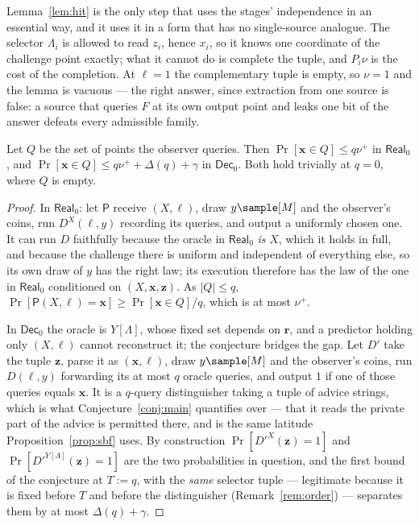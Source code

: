 \documentclass{conjura-conjecture}
\newcommand{\Prob}[1]{\Pr\!\left[#1\right]}
\newcommand{\vz}{\mathbf{z}}
\newcommand{\vr}{\mathbf{r}}
\newcommand{\vx}{\mathbf{x}}
\newcommand{\vl}{\boldsymbol{\ell}}
\newcommand{\Real}{\mathsf{Real}}
\newcommand{\Dec}{\mathsf{Dec}}
\begin{document}
\begin{remark}\label{rem:onesource}
Lemma~\ref{lem:hit} is the only step that uses the stages' independence in
an essential way, and it uses it in a form that has no single-source
analogue. The selector $\Lambda_i$ is allowed to read $z_i$, hence $x_i$,
so it knows one coordinate of the challenge point exactly; what it cannot
do is complete the tuple, and $P_i\nu$ is the cost of the completion. At
$\ell = 1$ the complementary tuple is empty, so $\nu = 1$ and the lemma is
vacuous --- the right answer, since extraction from one source is false: a
source that queries $F$ at its own output point and leaks one bit of the
answer defeats every admissible family.
\end{remark}

\begin{lemma}\label{lem:query}
Let $Q$ be the set of points the observer queries. Then
$\Prob{\vx \in Q} \le q\nu^{+}$ in $\Real_0$, and
$\Prob{\vx \in Q} \le q\nu^{+} + \Delta(q) + \gamma$ in $\Dec_0$. Both
hold trivially at $q = 0$, where $Q$ is empty.
\end{lemma}

\begin{proof}
In $\Real_0$: let $\mathsf{P}$ receive $(X,\vl)$, draw $y \sample [M]$ and
the observer's coins, run $D^{X}(\vl,y)$ recording its queries, and output
a uniformly chosen one. It can run $D$ faithfully because the oracle in
$\Real_0$ \emph{is} $X$, which it holds in full, and because the challenge
there is uniform and independent of everything else, so its own draw of
$y$ has the right law; its execution therefore has the law of the one in
$\Real_0$ conditioned on $(X,\vx,\vz)$. As $|Q| \le q$,
$\Prob{\mathsf{P}(X,\vl) = \vx} \ge \Prob{\vx \in Q}/q$, which is at most
$\nu^{+}$.

In $\Dec_0$ the oracle is $Y[\Lambda]$, whose fixed set depends on $\vr$,
and a predictor holding only $(X,\vl)$ cannot reconstruct it; the
conjecture bridges the gap. Let $D'$ take the tuple $\vz$, parse it as
$(\vx,\vl)$, draw $y \sample [M]$ and the observer's coins, run
$D(\vl,y)$ forwarding its at most $q$ oracle queries, and output $1$ if
one of those queries equals $\vx$. It is a $q$-query distinguisher taking
a tuple of advice strings, which is what Conjecture~\ref{conj:main}
quantifies over --- that it reads the private part of the advice is
permitted there, and is the same latitude Proposition~\ref{prop:sbf} uses.
By construction $\Prob{D'^{X}(\vz)=1}$ and
$\Prob{D'^{Y[\Lambda]}(\vz)=1}$ are the two probabilities in question, and
the first bound of the conjecture at $T := q$, with the \emph{same}
selector tuple --- legitimate because it is fixed before $T$ and before
the distinguisher (Remark~\ref{rem:order}) --- separates them by at most
$\Delta(q)+\gamma$.
\end{proof}
\end{document}
